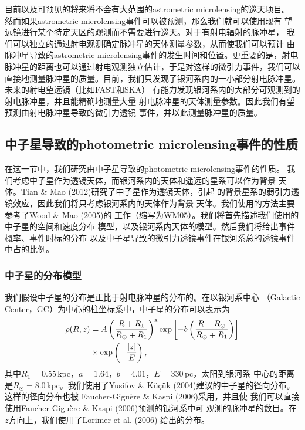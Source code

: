 目前以及可预见的将来将不会有大范围的astrometric microlensing的巡天项目。
然而如果astrometric microlensing事件可以被预测，那么我们就可以使用现有
望远镜进行某个特定天区的观测而不需要进行巡天。对于有射电辐射的脉冲星，
我们可以独立的通过射电观测确定脉冲星的天体测量参数，从而使我们可以预计
由脉冲星导致的astrometric microlensing事件的发生时间和位置。更重要的是，射电
脉冲星的距离也可以通过射电观测独立估计，于是对这样的微引力事件，我们可以
直接地测量脉冲星的质量。目前，我们只发现了银河系内的一小部分射电脉冲星。
未来的射电望远镜（比如FAST\supercite{Nan}和SKA\supercite{Johnston2007}）
有能力发现银河系内的大部分可观测到的射电脉冲星，并且能精确地测量大量
射电脉冲星的天体测量参数。因此我们有望预测由射电脉冲星导致的微引力透镜
事件，并以此测量脉冲星的质量。

\subsection{中子星导致的photometric microlensing事件的性质}

在这一节中，我们研究由中子星导致的photometric microlensing事件的性质。
我们考虑中子星作为透镜天体，而银河系内的天体和遥远的星系可以作为背景
天体。Tian \& Mao (2012)\supercite{Tian}研究了中子星作为透镜天体，引起
的背景星系的弱引力透镜效应，因此我们将只考虑银河系内的天体作为背景
天体。我们使用的方法主要参考了Wood \& Mao (2005)\supercite{Wood}的
工作（缩写为WM05）。我们将首先描述我们使用的中子星的空间和速度分布
模型，以及银河系内天体的模型。然后我们将给出事件概率、事件时标的分布
以及中子星导致的微引力透镜事件在银河系总的透镜事件中占的比例。

\subsubsection{中子星的分布模型}

我们假设中子星的分布是正比于射电脉冲星的分布的。在以银河系中心
（Galactic Center，GC）为中心的柱坐标系中，中子星的分布可以表示为
%
\begin{equation}
\begin{split}
\rho(R,z) & =A\left(\frac{R+R_{1}}{R_{\odot}+R_{1}}\right)^{\rm{a}}\exp\left[-b\left(\frac{R-R_{\odot}}{R_{\odot}+R_{1}}\right)\right]\\
          & \times\exp\left(-\frac{|z|}{E}\right),
\end{split}
\end{equation}
%
其中$R_{1}=0.55$\,kpc，$a=1.64$，$b=4.01$，$E=330$\,pc，太阳到银河系
中心的距离是$R_{\odot}=8.0$\,kpc。我们使用了Yusifov \& K{\"u}{\c c}{\"u}k 
(2004)\supercite{Yusifov}建议的中子星的径向分布。这样的径向分布也被
Faucher-Gigu{\`e}re \& Kaspi (2006)\supercite{Faucher}采用，并且使
我们可以直接使用Faucher-Gigu{\`e}re \& Kaspi (2006)预测的银河系中可
观测的脉冲星的数目。在$z$方向上，我们使用了Lorimer et al. (2006)\supercite{Lorimer06}
给出的分布。

